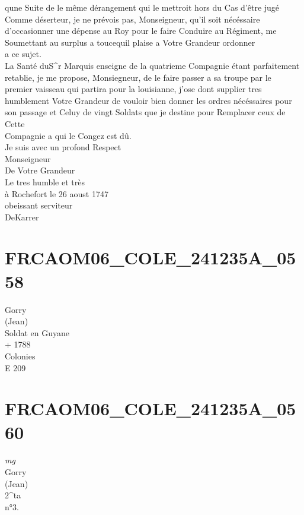 \documentclass{article}
\begin{document}
\begin{pages}
qune Suite de le même dérangement qui le mettroit hors du Cas d'être jugé\\
Comme déserteur, je ne prévois pas, Monseigneur, qu'il soit nécéssaire\\
d'occasionner une dépense au Roy pour le faire Conduire au Régiment, me\\
Soumettant au surplus a toucequil plaise a Votre Grandeur ordonner\\
a ce sujet.\\
La Santé duS\^{}r Marquis enseigne de la quatrieme Compagnie étant parfaitement\\
retablie, je me propose, Monsiegneur, de le faire passer a sa troupe par le\\
premier vaisseau qui partira pour la louisianne, j'ose dont supplier tres\\
humblement Votre Grandeur de vouloir bien donner les ordres nécéssaires pour\\
son passage et Celuy de vingt Soldats que je destine pour Remplacer ceux de Cette\\
Compagnie a qui le Congez est dû.\\
Je suis avec un profond Respect\\
Monseigneur\\
De Votre Grandeur\\
Le tres humble et très\\
à Rochefort le 26 aoust 1747\\
obeissant serviteur\\
DeKarrer
\pend
\endnumbering\beginnumbering\section{FRCAOM06\_COLE\_241235A\_0558}\pstart
Gorry\\
(Jean)\\
Soldat en Guyane\\
+ 1788\\
Colonies\\
E 209
\pend
\endnumbering\beginnumbering\section{FRCAOM06\_COLE\_241235A\_0560}
\vspace{0.5cm}\noindent
\textit{mg}
\footnotesize \\
Gorry\\
(Jean)\\
2\^{}ta\\
n°3.
\normalsize \pstart

\end{pages}
\end{document}
